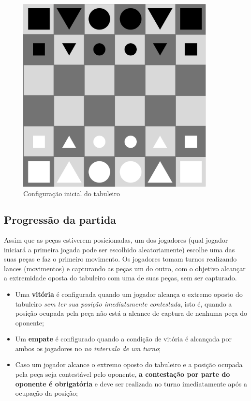 \begin{figure}[h]
    \centering
    \includegraphics[width=10cm]{Images/figure_1_board_setup}
    \caption{Configuração inicial do tabuleiro}
    \label{fig:configuracao tabuleiro}
\end{figure}

\subsection{Progressão da partida}\label{section:progressao}
Assim que as peças estiverem posicionadas, um dos jogadores (qual jogador iniciará a primeira jogada pode ser escolhido
aleatoriamente) escolhe uma das suas peças e faz o primeiro movimento. Os jogadores tomam turnos realizando lances
(movimentos) e capturando as peças um do outro, com o objetivo alcançar a extremidade oposta do tabuleiro com uma de suas
peças, sem ser capturado.

\begin{itemize}
  \item Uma \textbf{vitória} é configurada quando um jogador alcança o extremo oposto do tabuleiro \textit{sem ter sua
    posição imediatamente contestada}, isto é, quando a posição ocupada pela peça não está a alcance de captura de
    nenhuma peça do oponente;
  \item Um \textbf{empate} é configurado quando a condição de vitória é alcançada por ambos os jogadores no \textit{no
    intervalo de um turno};
  \item Caso um jogador alcance o extremo oposto do tabuleiro e a posição ocupada pela peça seja contestável pelo
    oponente, \textbf{a contestação por parte do oponente é obrigatória} e deve ser realizada no turno imediatamente
    após a ocupação da posição;
\end{itemize}

